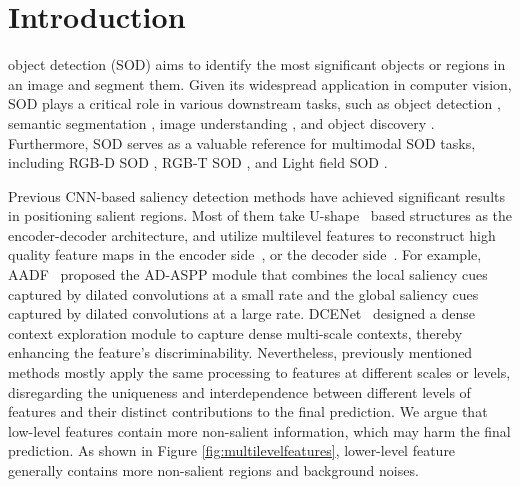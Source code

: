 \documentclass[lettersize,journal]{IEEEtran}
\begin{document}
\section{Introduction}
 object detection \cite{8332961} (SOD) aims to identify the most significant objects or regions in an image and segment them. Given its widespread application in computer vision, SOD plays a critical role in various downstream tasks, such as object detection \cite{6587754}, semantic segmentation \cite{sun2020mining}, image understanding \cite{6888473}, and object discovery \cite{6630857}. Furthermore, SOD serves as a valuable reference for multimodal SOD tasks, including RGB-D SOD \cite{li2023mutual, 9789193, 9925217}, RGB-T SOD \cite{9801871, 9161021}, and Light field SOD \cite{9153018, 10168184}. 

Previous CNN-based saliency detection methods have achieved significant results in positioning salient regions. Most of them take U-shape~\cite{Unet} based structures as the encoder-decoder architecture, and utilize multilevel features to reconstruct high quality feature maps in the encoder side~\cite{Amulet,8578428,8578285,Wang_2019_CVPR,BASNet,CPD}, or the decoder side~\cite{PAGRN,DSS,DHSNet,AADF,9389751,9797762,9745960}. 
For example, AADF~\cite{AADF} proposed the AD-ASPP module that combines the local saliency cues captured by dilated convolutions at a small rate and the global saliency cues captured by dilated convolutions at a large rate. DCENet~\cite{9389751} designed a dense context exploration module to capture dense multi-scale contexts, thereby enhancing the feature's discriminability. 
Nevertheless, previously mentioned methods mostly apply the same processing to features at different scales or levels, disregarding the uniqueness and interdependence between different levels of features and their distinct contributions to the final prediction. We argue that low-level features contain more non-salient information, which may harm the final prediction. As shown in Figure \ref{fig:multilevelfeatures}, lower-level feature generally contains more non-salient regions and background noises. 
\end{document}
